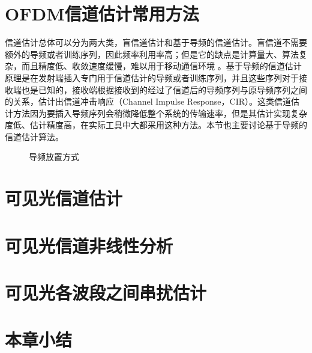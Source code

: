 \section{OFDM信道估计常用方法}
信道估计总体可以分为两大类，盲信道估计和基于导频的信道估计。盲信道不需要额外的导频或者训练序列，因此频率利用率高；但是它的缺点是计算量大、算法复杂，而且精度低、收敛速度缓慢，难以用于移动通信环境
\cite{石钧2012ofdm}。基于导频的信道估计原理是在发射端插入专门用于信道估计的导频或者训练序列，并且这些序列对于接收端也是已知的，接收端根据接收到的经过了信道后的导频序列与原导频序列之间的关系，估计出信道冲击响应（Channel Impulse Response，CIR）。这类信道估计方法因为要插入导频序列会稍微降低整个系统的传输速率，但是其估计实现复杂度低、估计精度高，在实际工具中大都采用这种方法。本节也主要讨论基于导频的信道估计算法。
\begin{figure}[htbp]
    \centering
    \caption{导频放置方式}
    \label{fig:PilotAllocation}
\end{figure}






\section{可见光信道估计}
\section{可见光信道非线性分析}
\section{可见光各波段之间串扰估计}
\section{本章小结}
